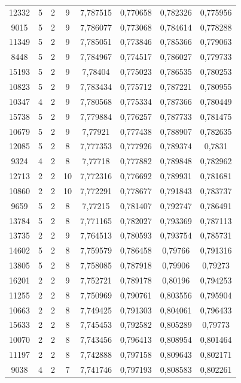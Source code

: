 \begin{longtable}{|c|c|c|c|c|c|c|c|}
12332 & 5 & 2 & 9 & 7,787515 & 0,770658 & 0,782326 & 0,775956 \\
9015 & 5 & 2 & 9 & 7,786077 & 0,773068 & 0,784614 & 0,778288 \\
11349 & 5 & 2 & 9 & 7,785051 & 0,773846 & 0,785366 & 0,779063 \\
8448 & 5 & 2 & 9 & 7,784967 & 0,774517 & 0,786027 & 0,779733 \\
15193 & 5 & 2 & 9 & 7,78404 & 0,775023 & 0,786535 & 0,780253 \\
10823 & 5 & 2 & 9 & 7,783434 & 0,775712 & 0,787221 & 0,780955 \\
10347 & 4 & 2 & 9 & 7,780568 & 0,775334 & 0,787366 & 0,780449 \\
15738 & 5 & 2 & 9 & 7,779884 & 0,776257 & 0,787733 & 0,781475 \\
10679 & 5 & 2 & 9 & 7,77921 & 0,777438 & 0,788907 & 0,782635 \\
12085 & 5 & 2 & 8 & 7,777353 & 0,777926 & 0,789374 & 0,7831 \\
9324 & 4 & 2 & 8 & 7,77718 & 0,777882 & 0,789848 & 0,782962 \\
12713 & 2 & 2 & 10 & 7,772316 & 0,776692 & 0,789931 & 0,781681 \\
10860 & 2 & 2 & 10 & 7,772291 & 0,778677 & 0,791843 & 0,783737 \\
9659 & 5 & 2 & 8 & 7,77215 & 0,781407 & 0,792747 & 0,786491 \\
13784 & 5 & 2 & 8 & 7,771165 & 0,782027 & 0,793369 & 0,787113 \\
13735 & 2 & 2 & 9 & 7,764513 & 0,780593 & 0,793754 & 0,785731 \\
14602 & 5 & 2 & 8 & 7,759579 & 0,786458 & 0,79766 & 0,791316 \\
13805 & 5 & 2 & 8 & 7,758085 & 0,787918 & 0,79906 & 0,79273 \\
16201 & 2 & 2 & 9 & 7,752721 & 0,789178 & 0,80196 & 0,794253 \\
11255 & 2 & 2 & 8 & 7,750969 & 0,790761 & 0,803556 & 0,795904 \\
10663 & 2 & 2 & 8 & 7,749425 & 0,791303 & 0,804061 & 0,796433 \\
15633 & 2 & 2 & 8 & 7,745453 & 0,792582 & 0,805289 & 0,79773 \\
10070 & 2 & 2 & 8 & 7,743456 & 0,796413 & 0,808954 & 0,801464 \\
11197 & 2 & 2 & 8 & 7,742888 & 0,797158 & 0,809643 & 0,802171 \\
9038 & 4 & 2 & 7 & 7,741746 & 0,797193 & 0,808583 & 0,802261 \\

\end{longtable}
